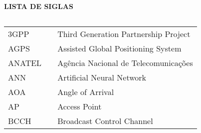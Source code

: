 \newpage

\begin{center}
\textbf{LISTA DE SIGLAS}
\end{center}
$\!$\\

\begin{tabular}{lll}
3GPP & \hspace{1cm} & Third Generation Partnership Project \\
AGPS &  \hspace{1cm} & Assisted Global Positioning System \\
ANATEL &  \hspace{1cm} & Agência Nacional de Telecomunicações \\
ANN & \hspace{1cm} & Artificial Neural Network \\
AOA&  \hspace{1cm} &Angle of Arrival \\
AP&  \hspace{1cm} &Access Point \\
BCCH&  \hspace{1cm} &Broadcast Control Channel \\
\end{tabular}
